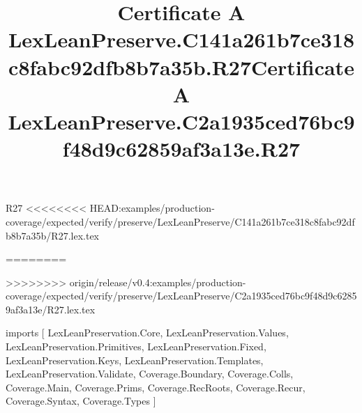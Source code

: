 \begin{lexlean}{R27}
<<<<<<<< HEAD:examples/production-coverage/expected/verify/preserve/LexLeanPreserve/C141a261b7ce318c8fabc92dfb8b7a35b/R27.lex.tex
\title{Certificate A LexLeanPreserve.C141a261b7ce318c8fabc92dfb8b7a35b.R27}
========
\title{Certificate A LexLeanPreserve.C2a1935ced76bc9f48d9c62859af3a13e.R27}
>>>>>>>> origin/release/v0.4:examples/production-coverage/expected/verify/preserve/LexLeanPreserve/C2a1935ced76bc9f48d9c62859af3a13e/R27.lex.tex
\begin{coremodule}
imports [
  LexLeanPreservation.Core,
  LexLeanPreservation.Values,
  LexLeanPreservation.Primitives,
  LexLeanPreservation.Fixed,
  LexLeanPreservation.Keys,
  LexLeanPreservation.Templates,
  LexLeanPreservation.Validate,
  Coverage.Boundary,
  Coverage.Colls,
  Coverage.Main,
  Coverage.Prims,
  Coverage.RecRoots,
  Coverage.Recur,
  Coverage.Syntax,
  Coverage.Types
]


\end{coremodule}
\end{lexlean}
